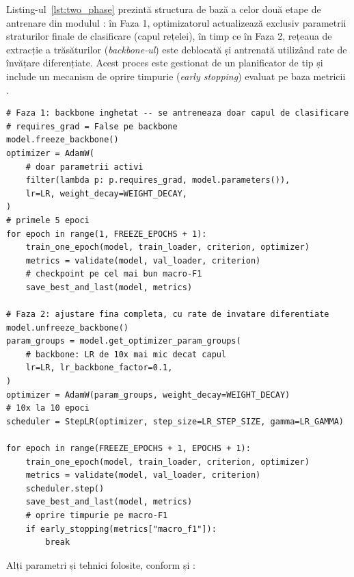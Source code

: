 \documentclass[../../main.tex]{subfiles}
\begin{document}
Listing-ul~\ref{lst:two_phase} prezintă structura de bază a celor două etape de antrenare din modulul : în Faza 1, optimizatorul actualizează exclusiv parametrii straturilor finale de clasificare (capul rețelei), în timp ce în Faza 2, rețeaua de extracție a trăsăturilor (\textit{backbone-ul}) este deblocată și antrenată utilizând rate de învățare diferențiate. Acest proces este gestionat de un planificator de tip  și include un mecanism de oprire timpurie (\textit{early stopping}) evaluat pe baza metricii .

\begin{listing}[H]
\begin{verbatim}
# Faza 1: backbone inghetat -- se antreneaza doar capul de clasificare
# requires_grad = False pe backbone
model.freeze_backbone()
optimizer = AdamW(
    # doar parametrii activi
    filter(lambda p: p.requires_grad, model.parameters()),
    lr=LR, weight_decay=WEIGHT_DECAY,
)
# primele 5 epoci
for epoch in range(1, FREEZE_EPOCHS + 1):
    train_one_epoch(model, train_loader, criterion, optimizer)
    metrics = validate(model, val_loader, criterion)
    # checkpoint pe cel mai bun macro-F1
    save_best_and_last(model, metrics)

# Faza 2: ajustare fina completa, cu rate de invatare diferentiate
model.unfreeze_backbone()
param_groups = model.get_optimizer_param_groups(
    # backbone: LR de 10x mai mic decat capul
    lr=LR, lr_backbone_factor=0.1,
)
optimizer = AdamW(param_groups, weight_decay=WEIGHT_DECAY)
# 10x la 10 epoci
scheduler = StepLR(optimizer, step_size=LR_STEP_SIZE, gamma=LR_GAMMA)

for epoch in range(FREEZE_EPOCHS + 1, EPOCHS + 1):
    train_one_epoch(model, train_loader, criterion, optimizer)
    metrics = validate(model, val_loader, criterion)
    scheduler.step()
    save_best_and_last(model, metrics)
    # oprire timpurie pe macro-F1
    if early_stopping(metrics["macro_f1"]):
        break
\end{verbatim}
\caption{Ajustarea fină în două faze a modelului SlowFast (\texttt{train.py}).}
\label{lst:two_phase}
\end{listing}

Alți parametri și tehnici folosite, conform  și :
\end{document}
